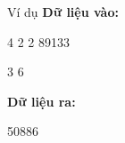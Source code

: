 Ví dụ
\textbf{     Dữ liệu vào:    }

    4 2 2 89133   

    3 6   

\textbf{     Dữ liệu ra:    }

    50886